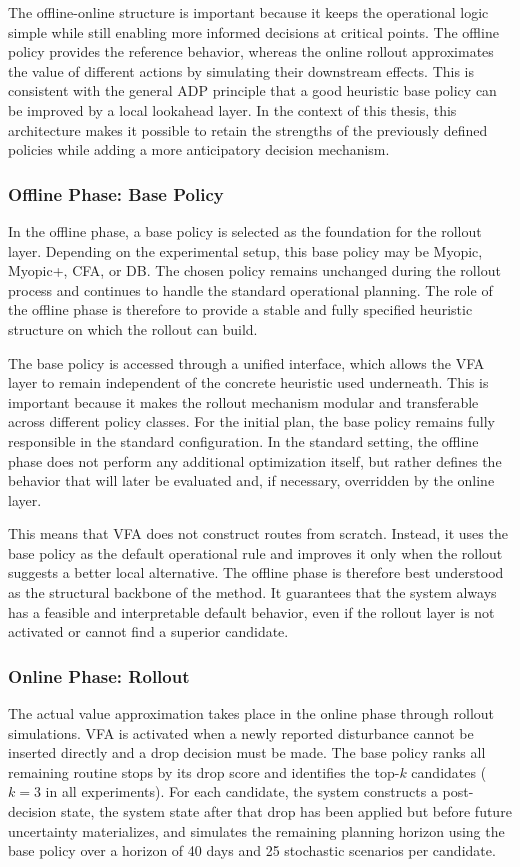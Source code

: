 \documentclass[12pt,oneside]{article}
\begin{document}
The offline-online structure is important because it keeps the operational logic simple while still enabling more informed decisions at critical points. The offline policy provides the reference behavior, whereas the online rollout approximates the value of different actions by simulating their downstream effects. This is consistent with the general ADP principle that a good heuristic base policy can be improved by a local lookahead layer. In the context of this thesis, this architecture makes it possible to retain the strengths of the previously defined policies while adding a more anticipatory decision mechanism.

\subsubsection*{Offline Phase: Base Policy}
In the offline phase, a base policy is selected as the foundation for the rollout layer. Depending on the experimental setup, this base policy may be Myopic, Myopic+, CFA, or DB. The chosen policy remains unchanged during the rollout process and continues to handle the standard operational planning. The role of the offline phase is therefore to provide a stable and fully specified heuristic structure on which the rollout can build.

The base policy is accessed through a unified interface, which allows the VFA layer to remain independent of the concrete heuristic used underneath. This is important because it makes the rollout mechanism modular and transferable across different policy classes. For the initial plan, the base policy remains fully responsible in the standard configuration. In the standard setting, the offline phase does not perform any additional optimization itself, but rather defines the behavior that will later be evaluated and, if necessary, overridden by the online layer.

This means that VFA does not construct routes from scratch. Instead, it uses the base policy as the default operational rule and improves it only when the rollout suggests a better local alternative. The offline phase is therefore best understood as the structural backbone of the method. It guarantees that the system always has a feasible and interpretable default behavior, even if the rollout layer is not activated or cannot find a superior candidate.

\subsubsection*{Online Phase: Rollout}
The actual value approximation takes place in the online phase through rollout simulations. VFA is activated when a newly reported disturbance cannot be inserted directly and a drop decision must be made. The base policy ranks all remaining routine stops by its drop score and identifies the top-$k$ candidates ($k = 3$ in all experiments). For each candidate, the system constructs a post-decision state, the system state after that drop has been applied but before future uncertainty materializes, and simulates the remaining planning horizon using the base policy over a horizon of 40 days and 25 stochastic scenarios per candidate.
\end{document}
